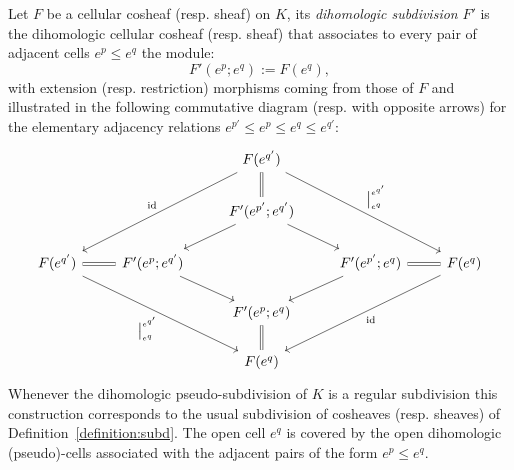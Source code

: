 \documentclass[AHL,Unicode,longabstracts,published]{cedram}
\DeclareMathOperator{\id}{id}
\begin{document}
\begin{defi}
Let $F$ be a cellular cosheaf (resp. sheaf) on $K$, its \emph{dihomologic subdivision} $F'$ is the dihomologic cellular cosheaf (resp. sheaf) that associates to every pair of adjacent cells $e^p\leq e^q$ the module:
\begin{equation*}
F'(e^p;e^q):=F(e^q),
\end{equation*}
with extension (resp. restriction) morphisms coming from those of $F$ and illustrated in the following commutative diagram (resp. with opposite arrows) for the elementary adjacency relations $e^{p'}\leq e^{p}\leq e^{q}\leq e^{q'}$:
\begin{equation*}
\begin{tikzcd}
& & F(e^{q'}) \arrow[ddll,"\id" above left] \arrow[ddrr,"\big|^{e^{q'}}_{e^q}"] \arrow[d,equal] & & \\%
& & F'(e^{p'};e^{q'}) \arrow[dr] \arrow[dl] & & \\%
F(e^{q'})\arrow[ddrr,"\big|^{e^{q'}}_{e^q}" below left] \arrow[r,equal] & F'(e^{p};e^{q'}) \arrow[dr] & & F'(e^{p'};e^{q}) \arrow[dl] \arrow[r,equal] & F(e^q) \arrow[ddll,"\id"] \\%
& & F'(e^{p};e^{q}) \arrow[d,equal] & & \\%
& & F(e^q) & &
\end{tikzcd}
\end{equation*}
Whenever the dihomologic pseudo-subdivision of $K$ is a regular subdivision this construction corresponds to the usual subdivision of cosheaves (resp. sheaves) of Definition~\ref{definition:subd}. The open cell $e^q$ is covered by the open dihomologic (pseudo)-cells associated with the adjacent pairs of the form $e^p\leq e^q$.
\end{defi}
\end{document}
